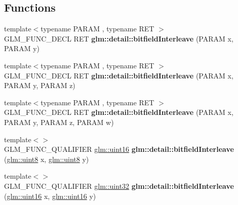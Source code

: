 \subsection*{Functions}
\begin{DoxyCompactItemize}
\item 
\mbox{\label{bitfield_8inl_a39644ee418ae41e3393d1cb6191e32a7}} 
{\footnotesize template$<$typename P\+A\+R\+AM , typename R\+ET $>$ }\\G\+L\+M\+\_\+\+F\+U\+N\+C\+\_\+\+D\+E\+CL R\+ET {\bfseries glm\+::detail\+::bitfield\+Interleave} (P\+A\+R\+AM x, P\+A\+R\+AM y)
\item 
\mbox{\label{bitfield_8inl_aa2fdd8f720417a13990873ba704a3426}} 
{\footnotesize template$<$typename P\+A\+R\+AM , typename R\+ET $>$ }\\G\+L\+M\+\_\+\+F\+U\+N\+C\+\_\+\+D\+E\+CL R\+ET {\bfseries glm\+::detail\+::bitfield\+Interleave} (P\+A\+R\+AM x, P\+A\+R\+AM y, P\+A\+R\+AM z)
\item 
\mbox{\label{bitfield_8inl_a606f6dc8c8314159fafef68f820c2c65}} 
{\footnotesize template$<$typename P\+A\+R\+AM , typename R\+ET $>$ }\\G\+L\+M\+\_\+\+F\+U\+N\+C\+\_\+\+D\+E\+CL R\+ET {\bfseries glm\+::detail\+::bitfield\+Interleave} (P\+A\+R\+AM x, P\+A\+R\+AM y, P\+A\+R\+AM z, P\+A\+R\+AM w)
\item 
\mbox{\label{bitfield_8inl_ac59c574dc7900d87786f5a96f82ea6e7}} 
{\footnotesize template$<$$>$ }\\G\+L\+M\+\_\+\+F\+U\+N\+C\+\_\+\+Q\+U\+A\+L\+I\+F\+I\+ER \hyperlink{group__gtc__type__precision_gad8c2939e1fdd8e5828b31d95c52255d5}{glm\+::uint16} {\bfseries glm\+::detail\+::bitfield\+Interleave} (\hyperlink{group__gtc__type__precision_ga1a7dcd8aac97cc8020817c94049deff2}{glm\+::uint8} x, \hyperlink{group__gtc__type__precision_ga1a7dcd8aac97cc8020817c94049deff2}{glm\+::uint8} y)
\item 
\mbox{\label{bitfield_8inl_ac5f2b38221d4447775e88f1b003f8113}} 
{\footnotesize template$<$$>$ }\\G\+L\+M\+\_\+\+F\+U\+N\+C\+\_\+\+Q\+U\+A\+L\+I\+F\+I\+ER \hyperlink{group__gtc__type__precision_ga202b6a53c105fcb7e531f9b443518451}{glm\+::uint32} {\bfseries glm\+::detail\+::bitfield\+Interleave} (\hyperlink{group__gtc__type__precision_gad8c2939e1fdd8e5828b31d95c52255d5}{glm\+::uint16} x, \hyperlink{group__gtc__type__precision_gad8c2939e1fdd8e5828b31d95c52255d5}{glm\+::uint16} y)

\end{DoxyCompactItemize}
